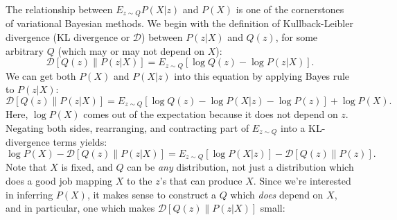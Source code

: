 \documentclass[a4paper, 11pt]{article} %
\begin{document}
The relationship between $E_{z\sim Q}P(X|z)$ and $P(X)$ is one of the cornerstones of variational Bayesian methods.
We begin with the definition of Kullback-Leibler divergence (KL divergence or $\mathcal{D}$) between $P(z|X)$ and $Q(z)$, for some arbitrary $Q$ (which may or may not depend on $X$):
\begin{equation}
    \mathcal{D}\left[Q(z)\|P(z|X)\right]=E_{z\sim Q}\left[\log Q(z) - \log P(z|X) \right].
\label{eq:kl}
\end{equation}
\noindent We can get both $P(X)$ and $P(X|z)$ into this equation by applying Bayes rule to $P(z|X)$:
\begin{equation}
    \mathcal{D}\left[Q(z)\|P(z|X)\right]=E_{z\sim Q}\left[\log Q(z) - \log P(X|z) - \log P(z) \right] + \log P(X).
\end{equation}
\noindent Here, $\log P(X)$ comes out of the expectation because it does not depend on $z$.  Negating both sides, rearranging, and contracting part of $E_{z\sim Q}$ into a KL-divergence terms yields:
\begin{equation}
    \log P(X) - \mathcal{D}\left[Q(z)\|P(z|X)\right]=E_{z\sim Q}\left[\log P(X|z)  \right] - \mathcal{D}\left[Q(z)\|P(z)\right].
\end{equation}
\noindent Note that $X$ is fixed, and $Q$ can be \textit{any} distribution, not just a distribution which does a good job mapping $X$ to the $z$'s that can produce $X$.  
Since we're interested in inferring $P(X)$, it makes sense to construct a $Q$ which \textit{does} depend on $X$, and in particular, one which makes $\mathcal{D}\left[Q(z)\|P(z|X)\right]$ small:
\end{document}
